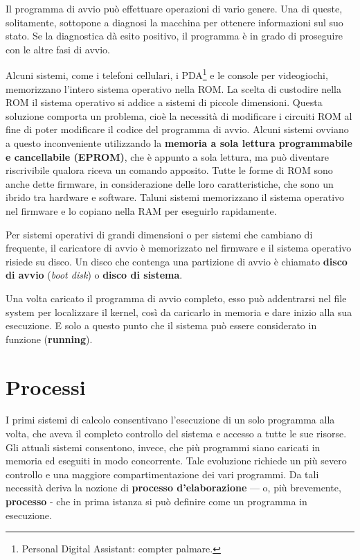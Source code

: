 \documentclass[11pt,a4paper]{article}
\begin{document}
Il
programma di avvio può effettuare operazioni di vario genere. Una di queste, solita­mente, sottopone a diagnosi la macchina per ottenere informazioni sul suo stato. Se la dia­gnostica dà esito positivo, il programma è in grado di proseguire con le altre fasi di avvio.

Alcuni sistemi, come i telefoni cellulari, i PDA\footnote{Personal Digital Assistant: compter palmare.} e le console per videogiochi, memoriz­zano l'intero sistema operativo nella ROM. La scelta di custodire nella ROM il sistema opera­tivo si addice a sistemi di piccole dimensioni.
Questa soluzione comporta un problema, cioè la necessità di
modificare i circuiti ROM al fine di poter modificare il codice del programma di avvio. Alcu­ni sistemi ovviano a questo inconveniente utilizzando la \textbf{memoria a sola lettura program­mabile e cancellabile (EPROM)}, che è appunto a sola lettura, ma può diventare riscrivibile
qualora riceva un comando apposito. Tutte le forme di ROM sono anche dette firmware, in
considerazione delle loro caratteristiche, che sono un ibrido tra hardware e software.
Taluni sistemi memorizzano il sistema operativo nel firmware e lo
copiano nella RAM per eseguirlo rapidamente.

Per sistemi operativi di grandi dimensioni o per sistemi che cambiano di frequente, il caricatore di av­vio è memorizzato nel firmware e il sistema operativo risiede su disco.
Un disco che conten­ga una partizione di avvio è chiamato \textbf{disco di avvio} (\emph{boot disk}) o \textbf{disco di sistema}.

Una volta caricato il programma di avvio completo, esso può addentrarsi nel file sys­tem per localizzare il kernel, così da caricarlo in memoria e dare inizio alla sua esecuzione. E
solo a questo punto che il sistema può essere considerato in funzione (\textbf{running}).

\section{Processi}
I primi sistemi di calcolo consentivano l'esecuzione di un solo programma alla volta, che
aveva il completo controllo del sistema e accesso a tutte le sue risorse. Gli attuali sistemi consentono, invece, che più programmi siano caricati in memoria ed eseguiti in mo­do concorrente. Tale evoluzione richiede un più severo controllo e una maggiore comparti­mentazione dei vari programmi. Da tali necessità deriva la nozione di \textbf{processo d'elabora­zione} — o, più brevemente, \textbf{processo} - che in prima istanza si può definire come un pro­gramma in esecuzione.
\end{document}
